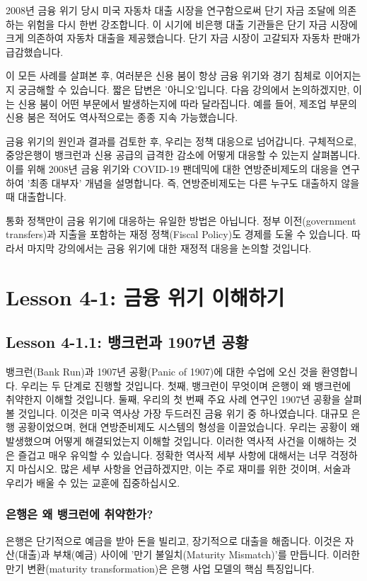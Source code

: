 \documentclass[11pt,a4paper]{article}
\theoremstyle{definition}
\begin{document}
2008년 금융 위기 당시 미국 자동차 대출 시장을 연구함으로써 단기 자금 조달에 의존하는 위험을 다시 한번 강조합니다. 이 시기에 비은행 대출 기관들은 단기 자금 시장에 크게 의존하여 자동차 대출을 제공했습니다. 단기 자금 시장이 고갈되자 자동차 판매가 급감했습니다.

이 모든 사례를 살펴본 후, 여러분은 신용 붐이 항상 금융 위기와 경기 침체로 이어지는지 궁금해할 수 있습니다. 짧은 답변은 '아니오'입니다. 다음 강의에서 논의하겠지만, 이는 신용 붐이 어떤 부문에서 발생하는지에 따라 달라집니다. 예를 들어, 제조업 부문의 신용 붐은 적어도 역사적으로는 종종 지속 가능했습니다.

금융 위기의 원인과 결과를 검토한 후, 우리는 정책 대응으로 넘어갑니다. 구체적으로, 중앙은행이 뱅크런과 신용 공급의 급격한 감소에 어떻게 대응할 수 있는지 살펴봅니다. 이를 위해 2008년 금융 위기와 COVID-19 팬데믹에 대한 연방준비제도의 대응을 연구하여 '최종 대부자' 개념을 설명합니다. 즉, 연방준비제도는 다른 누구도 대출하지 않을 때 대출합니다.

통화 정책만이 금융 위기에 대응하는 유일한 방법은 아닙니다. 정부 이전(government transfers)과 지출을 포함하는 재정 정책(Fiscal Policy)도 경제를 도울 수 있습니다. 따라서 마지막 강의에서는 금융 위기에 대한 재정적 대응을 논의할 것입니다.

\newpage

\section{Lesson 4-1: 금융 위기 이해하기}

\subsection{Lesson 4-1.1: 뱅크런과 1907년 공황}
뱅크런(Bank Run)과 1907년 공황(Panic of 1907)에 대한 수업에 오신 것을 환영합니다. 우리는 두 단계로 진행할 것입니다. 첫째, 뱅크런이 무엇이며 은행이 왜 뱅크런에 취약한지 이해할 것입니다. 둘째, 우리의 첫 번째 주요 사례 연구인 1907년 공황을 살펴볼 것입니다. 이것은 미국 역사상 가장 두드러진 금융 위기 중 하나였습니다. 대규모 은행 공황이었으며, 현대 연방준비제도 시스템의 형성을 이끌었습니다. 우리는 공황이 왜 발생했으며 어떻게 해결되었는지 이해할 것입니다. 이러한 역사적 사건을 이해하는 것은 즐겁고 매우 유익할 수 있습니다. 정확한 역사적 세부 사항에 대해서는 너무 걱정하지 마십시오. 많은 세부 사항을 언급하겠지만, 이는 주로 재미를 위한 것이며, 서술과 우리가 배울 수 있는 교훈에 집중하십시오.

\subsubsection*{은행은 왜 뱅크런에 취약한가?}
은행은 단기적으로 예금을 받아 돈을 빌리고, 장기적으로 대출을 해줍니다. 이것은 자산(대출)과 부채(예금) 사이에 '만기 불일치(Maturity Mismatch)'를 만듭니다. 이러한 만기 변환(maturity transformation)은 은행 사업 모델의 핵심 특징입니다.
\end{document}
